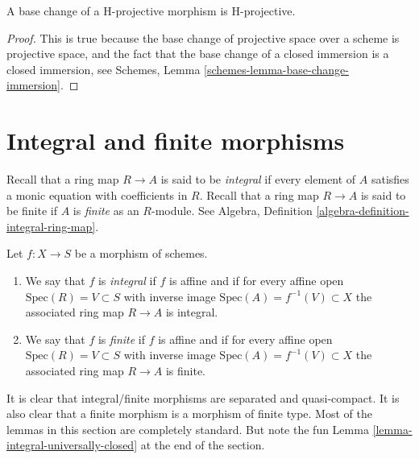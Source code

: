 \begin{lemma}
\label{lemma-H-projective-base-change}
A base change of a H-projective morphism is H-projective.
\end{lemma}

\begin{proof}
This is true because the base change of projective space
over a scheme is projective space, and the fact that the base
change of a closed immersion is a closed immersion, see
Schemes, Lemma \ref{schemes-lemma-base-change-immersion}.
\end{proof}











\section{Integral and finite morphisms}
\label{section-integral}

\noindent
Recall that a ring map $R \to A$ is said to be {\it integral}
if every element of $A$ satisfies a monic equation with
coefficients in $R$. Recall that a ring map $R \to A$ is
said to be finite if $A$ is {\it finite} as an $R$-module.
See Algebra, Definition \ref{algebra-definition-integral-ring-map}.

\begin{definition}
\label{definition-integral}
Let $f : X \to S$ be a morphism of schemes.
\begin{enumerate}
\item We say that $f$ is {\it integral} if $f$ is affine
and if for every affine open $\text{Spec}(R) = V \subset S$
with inverse image $\text{Spec}(A) = f^{-1}(V) \subset X$
the associated ring map $R \to A$ is integral.
\item We say that $f$ is {\it finite} if $f$ is affine
and if for every affine open $\text{Spec}(R) = V \subset S$
with inverse image $\text{Spec}(A) = f^{-1}(V) \subset X$
the associated ring map $R \to A$ is finite.
\end{enumerate}
\end{definition}

\noindent
It is clear that integral/finite morphisms are separated and
quasi-compact. It is also clear that a finite morphism is a
morphism of finite type. Most of the lemmas in this section are
completely standard.
But note the fun Lemma \ref{lemma-integral-universally-closed}
at the end of the section.

